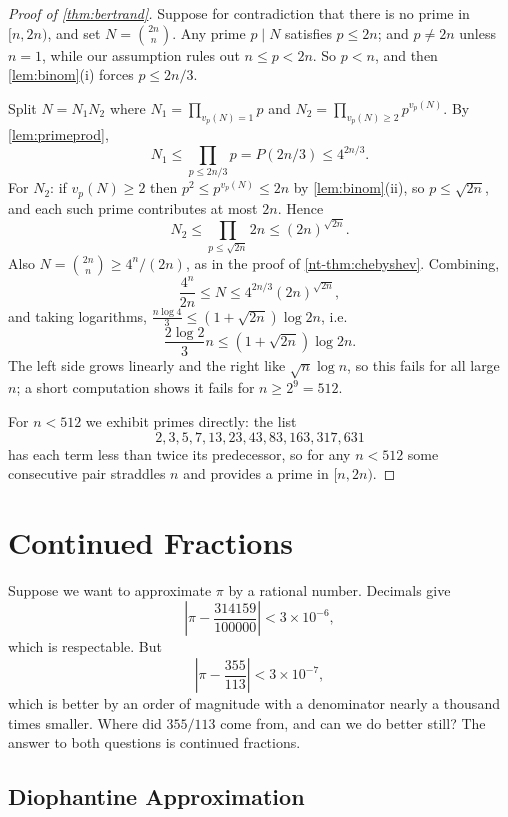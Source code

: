 \begin{proof}[Proof of \autoref{thm:bertrand}]
	Suppose for contradiction that there is no prime in $[n, 2n)$, and set $N = \binom{2n}n$. Any prime $p \mid N$ satisfies $p \leq 2n$; and $p \neq 2n$ unless $n = 1$, while our assumption rules out $n \leq p < 2n$. So $p < n$, and then \autoref{lem:binom}(i) forces $p \leq 2n/3$.

	Split $N = N_1N_2$ where $N_1 = \prod_{v_p(N) = 1}p$ and $N_2 = \prod_{v_p(N) \geq 2}p^{v_p(N)}$. By \autoref{lem:primeprod},
	$$
	N_1 \leq \prod_{p \leq 2n/3}p = P(2n/3) \leq 4^{2n/3}.
	$$
	For $N_2$: if $v_p(N) \geq 2$ then $p^2 \leq p^{v_p(N)} \leq 2n$ by \autoref{lem:binom}(ii), so $p \leq \sqrt{2n}$, and each such prime contributes at most $2n$. Hence
	$$
	N_2 \leq \prod_{p \leq \sqrt{2n}}2n \leq (2n)^{\sqrt{2n}}.
	$$
	Also $N = \binom{2n}n \geq 4^n/(2n)$, as in the proof of \autoref{nt-thm:chebyshev}. Combining,
	$$
	\frac{4^n}{2n} \leq N \leq 4^{2n/3}(2n)^{\sqrt{2n}},
	$$
	and taking logarithms, $\frac{n\log 4}{3} \leq (1 + \sqrt{2n})\log 2n$, i.e.
	$$
	\frac{2\log 2}{3}n \leq \left(1 + \sqrt{2n}\right)\log 2n.
	$$
	The left side grows linearly and the right like $\sqrt n \log n$, so this fails for all large $n$; a short computation shows it fails for $n \geq 2^9 = 512$.

	For $n < 512$ we exhibit primes directly: the list
	$$
	2, 3, 5, 7, 13, 23, 43, 83, 163, 317, 631
	$$
	has each term less than twice its predecessor, so for any $n < 512$ some consecutive pair straddles $n$ and provides a prime in $[n, 2n)$.
\end{proof}

\section{Continued Fractions}

Suppose we want to approximate $\pi$ by a rational number. Decimals give
$$
\left|\pi - \frac{314159}{100000}\right| < 3\times 10^{-6},
$$
which is respectable. But
$$
\left|\pi - \frac{355}{113}\right| < 3\times10^{-7},
$$
which is better by an order of magnitude with a denominator nearly a thousand times smaller. Where did $355/113$ come from, and can we do better still? The answer to both questions is continued fractions.

\subsection{Diophantine Approximation}

